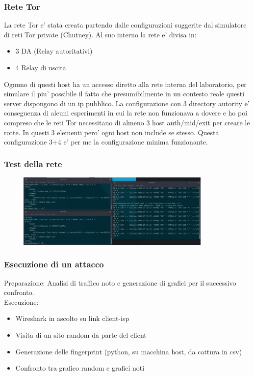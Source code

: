 \documentclass{beamer}[10pt]
\begin{document}
\begin{frame}
  \frametitle{Rete Tor}
  La rete Tor e' stata creata partendo dalle configurazioni suggerite dal simulatore di reti Tor private (Chutney). Al suo interno la rete e' divisa in:
  \begin{itemize}
    \item 3 DA (Relay autoritativi)
    \item 4 Relay di uscita
  \end{itemize}
  Ognuno di questi host ha un accesso diretto alla rete interna del laboratorio, per simulare il piu' possibile il fatto che presumibilmente in un contesto reale questi server dispongono di un ip pubblico.
  La configurazione con 3 directory autority e' conseguenza di alcuni esperimenti in cui la rete non funzionava a dovere e ho poi compreso che le reti Tor necessitano di almeno 3 host auth/mid/exit per creare le rotte.
  In questi 3 elementi pero' ogni host non include se stesso. Questa configurazione 3+4 e' per me la configurazione minima funzionante.
\end{frame}


\begin{frame}
  \frametitle{Test della rete}
  \begin{figure}
    \centering
    \includegraphics[width=0.851\textwidth]{../img/terminali_2.png}
  \end{figure}
\end{frame}

\begin{frame}
  \frametitle{Esecuzione di un attacco}
  Preparazione: Analisi di traffico noto e generazione di grafici per il successivo confronto.
  \\Esecuzione: 
  \begin{itemize}
    \item Wireshark in ascolto su link client-isp
    \item Visita di un sito random da parte del client
    \item Generazione delle fingerprint (python, su macchina host, da cattura in csv)
    \item Confronto tra grafico random e grafici noti
  \end{itemize}
\end{frame}
\end{document}
